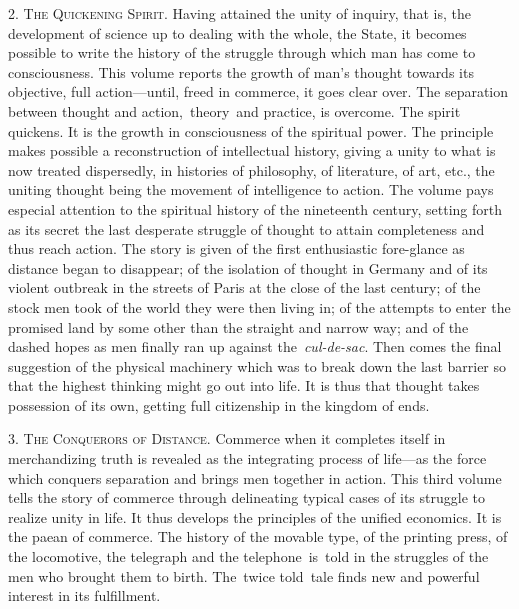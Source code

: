 \documentclass[openany,nobib]{tufte-book}
\begin{document}
\vspace{0.05in}

2. \textsc{The Quickening Spirit}. Having attained the unity of inquiry, that is,
the development of science up to dealing with the whole, the State, it
becomes possible to write the history of the struggle through which man
has come to consciousness. This volume reports the growth of man's
thought towards its objective, full action---until, freed in commerce,
it goes clear over. The separation between thought and
action,~theory~and practice, is overcome. The spirit quickens. It is the
growth in consciousness of the spiritual power. The principle makes
possible a reconstruction of intellectual history, giving a unity to
what is now treated dispersedly, in histories of philosophy, of
literature, of art, etc., the uniting thought being the movement of
intelligence to action. The volume pays especial attention to the
spiritual history of the nineteenth century, setting forth as its secret
the last desperate struggle of thought to attain completeness and thus
reach action. The story is given of the first enthusiastic fore-glance
as distance began to disappear; of the isolation of thought in Germany
and of its violent outbreak in the streets of Paris at the close of the
last century; of the stock men took of the world they were then living
in; of the attempts to enter the promised land by some other than the
straight and narrow way; and of the dashed hopes as men finally ran up
against the~\emph{cul-de-sac}. Then comes the final suggestion of the
physical machinery which was to break down the last barrier so that the
highest thinking might go out into life. It is thus that thought takes
possession of its own, getting full citizenship in the kingdom of ends.~

\vspace{0.05in}

3. \textsc{The Conquerors of Distance}. Commerce when it completes itself in
merchandizing truth is revealed as the integrating process of life---as
the force which conquers separation and brings men together in action.
This third volume tells the story of commerce through delineating
typical cases of its struggle to realize unity in life. It thus develops
the principles of the unified economics. It is the paean of commerce.
The history of the movable type, of the printing press, of the
locomotive, the telegraph and the telephone~is~told in the struggles of
the men who brought them to birth. The~twice told~tale finds new and
powerful interest in its fulfillment. ~
\end{document}
